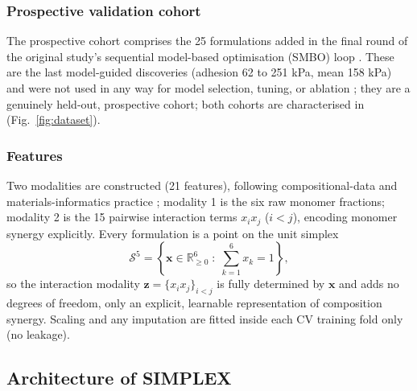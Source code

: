 \documentclass[utf8]{FrontiersinHarvard}
\newcommand{\Fref}[2]{Fig.~\hyperref[#1]{\ref{#1}#2}}
\begin{document}
\subsubsection{Prospective validation cohort}
The prospective cohort comprises the 25 formulations added in the final round of the original study's sequential model-based optimisation (SMBO) loop \cite{liao2025nature}. These are the last model-guided discoveries (adhesion 62 to 251 kPa, mean 158 kPa) and were not used in any way for model selection, tuning, or ablation \cite{tibshirani1996lasso}; they are a genuinely held-out, prospective cohort; both cohorts are characterised in (\Fref{fig:dataset}{}).

\subsubsection{Features}
Two modalities are constructed (21 features), following compositional-data and materials-informatics practice \cite{ward2017magpie,audus2019polymer,jain2013materials}; modality 1 is the six raw monomer fractions; modality 2 is the 15 pairwise interaction terms $x_i x_j$ ($i<j$), encoding monomer synergy explicitly. Every formulation is a point on the unit simplex
\begin{equation}
\mathcal{S}^5 = \left\{ \mathbf{x} \in \mathbb{R}^6_{\ge 0} \;:\; \sum_{k=1}^{6} x_k = 1 \right\},
\label{eq:simplex}
\end{equation}
so the interaction modality $\mathbf{z} = \{x_i x_j\}_{i<j}$ is fully determined by $\mathbf{x}$ and adds no degrees of freedom, only an explicit, learnable representation of composition synergy. Scaling and any imputation are fitted inside each CV training fold only (no leakage).

\subsection{Architecture of SIMPLEX}
\end{document}
